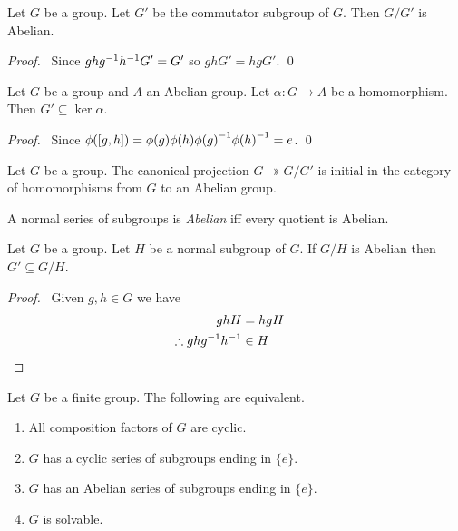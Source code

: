 \begin{prop}
Let $G$ be a group. Let $G'$ be the commutator subgroup of $G$. Then $G / G'$ is Abelian.
\end{prop}

\begin{proof}
\pf\ Since $gh{g}^{-1}{h}^{-1}G' = G'$ so $ghG' = hgG'$. \qed
\end{proof}

\begin{prop}
Let $G$ be a group and $A$ an Abelian group. Let $\alpha : G \rightarrow A$ be a homomorphism. Then $G' \subseteq \ker \alpha$.
\end{prop}

\begin{proof}
\pf\ Since $\phi([g,h]) = \phi(g) \phi(h) {\phi(g)}^{-1} {\phi(h)}^{-1} = e$. \qed
\end{proof}

\begin{cor}
Let $G$ be a group.
The canonical projection $G \twoheadrightarrow G / G'$ is initial in the category of homomorphisms from $G$ to an Abelian group.
\end{cor}

\begin{df}
A normal series of subgroups is \emph{Abelian} iff every quotient is Abelian.
\end{df}

\begin{lm}
\label{lm:GH-Abelian}
Let $G$ be a group. Let $H$ be a normal subgroup of $G$. If $G/H$ is Abelian then $G' \subseteq G/H$.
\end{lm}

\begin{proof}
\pf\ Given $g,h \in G$ we have
\begin{align*}
ghH & = hgH \\
\therefore gh{g}^{-1}{h}^{-1} & \in H & \relax
\end{align*}
\end{proof}

\begin{prop}
\label{prop:solvable}
Let $G$ be a finite group. The following are equivalent.
\begin{enumerate}
\item All composition factors of $G$ are cyclic.
\item $G$ has a cyclic series of subgroups ending in $\{e\}$.
\item $G$ has an Abelian series of subgroups ending in $\{e\}$.
\item $G$ is solvable.
\end{enumerate}
\end{prop}

